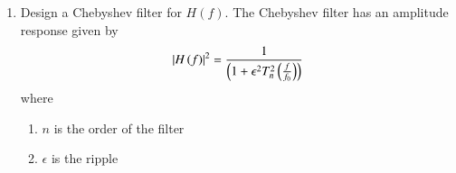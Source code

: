 \documentclass[journal,12pt,twocolumn]{IEEEtran}
\renewcommand\thesection{\arabic{section}}
\begin{document}
\begin{enumerate}[label=\thesection.\arabic*
		,ref=\thesection.\theenumi]
		Assumptions for the lowpass analog Butterworth filter:
		\begin{enumerate}
			\item Passband edge, $f_p = 50$ Hz
			\item Stopband edge, $f_s = 100$ Hz
			\item Passband attenuation, $A_p = -1$ dB
			\item Stopband attenuation, $A_s = -20$ dB
		\end{enumerate}
		We are required to find a desriable order $n$ and cutoff
		frequency $f_0$ for the filter. From \eqref{eq:loss},
		\begin{align}
			A_p &= -10\log_{10}\sbrak{1 + \brak{\frac{f_p}{f_0}}^{2n}} \\
			A_s &= -10\log_{10}\sbrak{1 + \brak{\frac{f_s}{f_0}}^{2n}}
		\end{align}
		Thus,
		\begin{align}
			\brak{\frac{f_p}{f_0}}^{2n} = 10^{-\frac{A_p}{10}} - 1 \label{eq:fc1} \\
			\brak{\frac{f_s}{f_0}}^{2n} = 10^{-\frac{A_s}{10}} - 1 \label{eq:fc2}
		\end{align}
		Therefore, on dividing the above equations and solving for $n$,
		\begin{align}
			n = \frac{\log\brak{10^{-\frac{A_s}{10}} - 1} - 
				\log\brak{10^{-\frac{A_p}{10}} - 1}}{2\brak{\log{f_s} - \log{f_p}}}
		\end{align}
		In this case, making appropriate susbstitutions gives $n = 4.29$.
		Hence, we take $n = 5$. Solving for $f_0$ in \eqref{eq:fc1} and
		\eqref{eq:fc2},
		\begin{align}
			f_{c1} = f_p\sbrak{10^{-\frac{A_p}{10}} - 1}^{-\frac{1}{2n}} = {57.23}{Hz} \\
			f_{c2} = f_s\sbrak{10^{-\frac{A_s}{10}} - 1}^{-\frac{1}{2n}} = {63.16}{Hz}
		\end{align}
		Hence, we take $f_0 = \sqrt{f_{c1}f_{c2}} = {60}{Hz}$ approximately.
		\item Design a Chebyshev filter for $H(f)$.
		\solution The Chebyshev filter has an amplitude response
		given by
		\begin{align}
			\left\vert H\left(f\right)\right\vert^2 = \frac{1}{\left(1 + \epsilon^2T_n^2\left(\frac{f}{f_0}\right)\right)}
		\end{align}
		where 
		\begin{enumerate}
			\item $n$ is the order of the filter
			\item $\epsilon$ is the ripple

\end{enumerate}
\end{enumerate}
\end{document}
